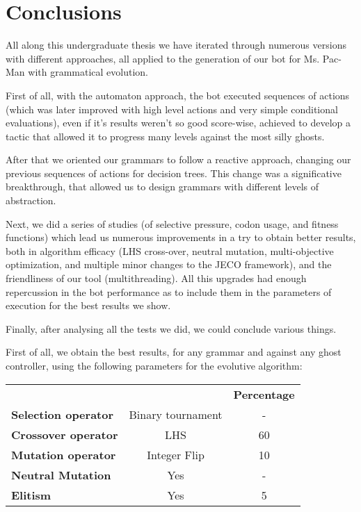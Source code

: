 \chapter{Conclusions}
All along this undergraduate thesis we have iterated through numerous versions with different approaches, all applied to the generation of our bot for Ms. Pac-Man with grammatical evolution.
 
First of all, with the automaton approach, the bot executed sequences of actions (which was later improved with high level actions and very simple conditional evaluations), even if it’s results weren’t so good score-wise, achieved to develop a tactic that allowed it to progress many levels against the most silly ghosts.
 
After that we oriented our grammars to follow a reactive approach, changing our previous sequences of actions for decision trees. This change was a significative breakthrough, that allowed us to design grammars with different levels of abstraction.
 
Next, we did a series of studies (of selective pressure, codon usage, and fitness functions) which lead us numerous improvements in a try to obtain better results, both in algorithm efficacy (LHS cross-over, neutral mutation, multi-objective optimization, and multiple minor changes to the JECO framework), and the friendliness of our tool (multithreading). All this upgrades had enough repercussion in the bot performance as to include them in the parameters of execution for the best results we show.
 
Finally, after analysing all the tests we did, we could conclude various things.
 
First of all, we obtain the best results, for any grammar and against any ghost controller, using the following parameters for the evolutive algorithm:
\begin{table}[H]
\centering
\begin{tabular}{lcc}
\cline{3-3}
                                                   &                                                               & \textbf{Percentage} \\ \cline{3-3} 
\multicolumn{1}{|l|}{\textbf{Selection operator}} & Binary tournament \footnotemark & -                   \\
\multicolumn{1}{|l|}{\textbf{Crossover operator}}     & LHS                                                           & 60                  \\
\multicolumn{1}{|l|}{\textbf{Mutation operator}}  & Integer Flip                                                  & 10                  \\
\multicolumn{1}{|l|}{\textbf{Neutral Mutation}}    & Yes                                                            & -                   \\
\multicolumn{1}{|l|}{\textbf{Elitism}}            & Yes                                                            & 5                  
\end{tabular}
\end{table}

